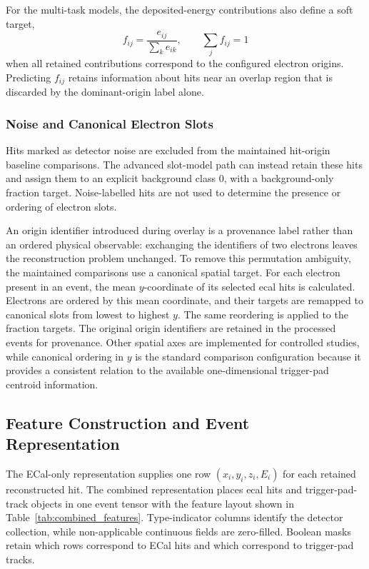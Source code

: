 For the multi-task models, the deposited-energy contributions also define a
soft target,
\begin{equation}
    f_{ij} =
    \frac{e_{ij}}{\sum_k e_{ik}},
    \qquad
    \sum_j f_{ij}=1
\end{equation}
when all retained contributions correspond to the configured electron
origins. Predicting \(f_{ij}\) retains information about hits near an overlap
region that is discarded by the dominant-origin label alone.

\subsubsection{Noise and Canonical Electron Slots}

Hits marked as detector noise are excluded from the maintained hit-origin
baseline comparisons. The advanced slot-model path can instead retain these
hits and assign them to an explicit background class \(0\), with a
background-only fraction target. Noise-labelled hits are not used to
determine the presence or ordering of electron slots.

An origin identifier introduced during overlay is a provenance label rather
than an ordered physical observable: exchanging the identifiers of two
electrons leaves the reconstruction problem unchanged. To remove this
permutation ambiguity, the maintained comparisons use a canonical spatial
target. For each electron present in an event, the mean \(y\)-coordinate of
its selected \gls{ecal} hits is calculated. Electrons are ordered by this
mean coordinate, and their targets are remapped to canonical slots from
lowest to highest \(y\). The same reordering is applied to the fraction
targets. The original origin identifiers are retained in the processed
events for provenance. Other spatial axes are implemented for controlled
studies, while canonical ordering in \(y\) is the standard comparison
configuration because it provides a consistent relation to the available
one-dimensional trigger-pad centroid information.

\subsection{Feature Construction and Event Representation}
\label{sec:method_features}

The ECal-only representation supplies one row
\((x_i,y_i,z_i,E_i)\) for each retained reconstructed hit. The combined
representation places \gls{ecal} hits and trigger-pad-track objects in one
event tensor with the feature layout shown in
Table~\ref{tab:combined_features}. Type-indicator columns identify the
detector collection, while non-applicable continuous fields are zero-filled.
Boolean masks retain which rows correspond to ECal hits and which correspond
to trigger-pad tracks.

